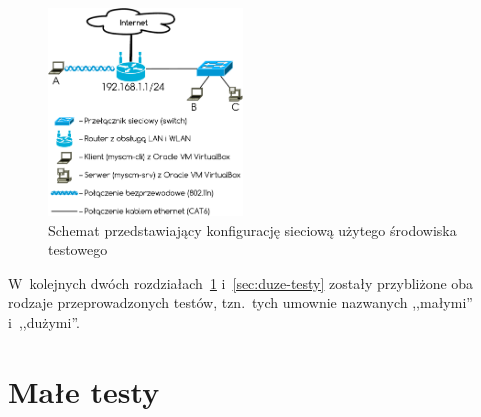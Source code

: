 \documentclass[thesis]{subfiles}
\begin{document}
\begin{figure}
	\centering
	\includegraphics[width=0.46\textwidth]{img/testing-network}
	\caption{Schemat przedstawiający konfigurację sieciową użytego środowiska testowego}
	\label{fig:testing-network}
\end{figure}

W~kolejnych dwóch rozdziałach~\ref{sec:male-testy} i~\ref{sec:duze-testy} zostały przybliżone oba rodzaje przeprowadzonych testów, tzn.~tych umownie nazwanych ,,małymi'' i~,,dużymi''.


\section{Małe testy}
\label{sec:male-testy}
\end{document}
